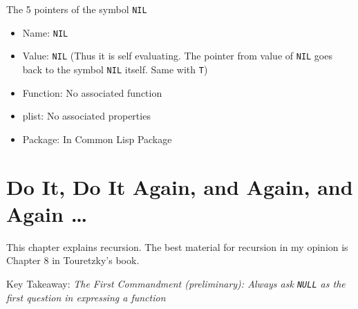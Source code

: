 \documentclass[11pt]{article}
\begin{document}
The 5 pointers of the symbol \texttt{NIL}
\begin{itemize}
\item Name: \texttt{NIL}
\item Value: \texttt{NIL} (Thus it is self evaluating. The pointer from value of \texttt{NIL} goes back to the symbol \texttt{NIL} itself.
Same with \texttt{T})
\item Function: No associated function
\item plist: No associated properties
\item Package: In Common Lisp Package
\end{itemize}


\newpage
\section{Do It, Do It Again, and Again, and Again \ldots{}}
\label{sec:org0c91591}

This chapter explains recursion. The best material for recursion in my opinion is Chapter 8 in  Touretzky's book.

Key Takeaway:
\emph{The First Commandment (preliminary): Always ask \texttt{NULL} as the first question in expressing a function}
\end{document}
